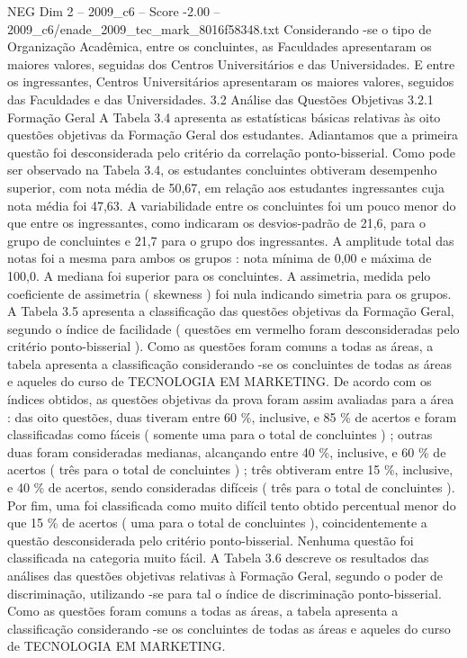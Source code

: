 \begin{textsample}{NEG Dim 2 – 2009\_c6 – Score -2.00 – 2009\_c6/enade\_2009\_tec\_mark\_8016f58348.txt}
Considerando -se o tipo de Organização Acadêmica, entre os concluintes, as Faculdades apresentaram os maiores valores, seguidas dos Centros Universitários e das Universidades.
E entre os ingressantes, Centros Universitários apresentaram os maiores valores, seguidos das Faculdades e das Universidades. 3.2 Análise das Questões Objetivas 3.2.1 Formação Geral A Tabela 3.4 apresenta as estatísticas básicas relativas às oito questões objetivas da Formação Geral dos estudantes.
Adiantamos que a primeira questão foi desconsiderada pelo critério da correlação ponto-bisserial.
Como pode ser observado na Tabela 3.4, os estudantes concluintes obtiveram desempenho superior, com nota média de 50,67, em relação aos estudantes ingressantes cuja nota média foi 47,63.
A variabilidade entre os concluintes foi um pouco menor do que entre os ingressantes, como indicaram os desvios-padrão de 21,6, para o grupo de concluintes e 21,7 para o grupo dos ingressantes.
A amplitude total das notas foi a mesma para ambos os grupos : nota mínima de 0,00 e máxima de 100,0.
A mediana foi superior para os concluintes.
A assimetria, medida pelo coeficiente de assimetria ( skewness ) foi nula indicando simetria para os grupos.
A Tabela 3.5 apresenta a classificação das questões objetivas da Formação Geral, segundo o índice de facilidade ( questões em vermelho foram desconsideradas pelo critério ponto-bisserial ).
Como as questões foram comuns a todas as áreas, a tabela apresenta a classificação considerando -se os concluintes de todas as áreas e aqueles do curso de TECNOLOGIA EM MARKETING.
De acordo com os índices obtidos, as questões objetivas da prova foram assim avaliadas para a área : das oito questões, duas tiveram entre 60 \%, inclusive, e 85 \% de acertos e foram classificadas como fáceis ( somente uma para o total de concluintes ) ; outras duas foram consideradas medianas, alcançando entre 40 \%, inclusive, e 60 \% de acertos ( três para o total de concluintes ) ; três obtiveram entre 15 \%, inclusive, e 40 \% de acertos, sendo consideradas difíceis ( três para o total de concluintes ).
Por fim, uma foi classificada como muito difícil tento obtido percentual menor do que 15 \% de acertos ( uma para o total de concluintes ), coincidentemente a questão desconsiderada pelo critério ponto-bisserial.
Nenhuma questão foi classificada na categoria muito fácil.
A Tabela 3.6 descreve os resultados das análises das questões objetivas relativas à Formação Geral, segundo o poder de discriminação, utilizando -se para tal o índice de discriminação ponto-bisserial.
Como as questões foram comuns a todas as áreas, a tabela apresenta a classificação considerando -se os concluintes de todas as áreas e aqueles do curso de TECNOLOGIA EM MARKETING.

\end{textsample}
